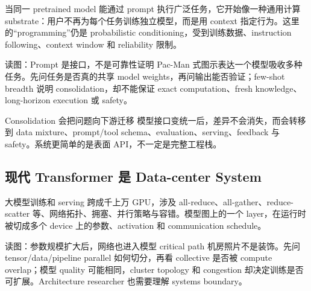 当同一 pretrained model 能通过 prompt 执行广泛任务，它开始像一种通用计算 substrate：用户不再为每个任务训练独立模型，而是用 context 指定行为。这里的“programming”仍是 probabilistic conditioning，受到训练数据、instruction following、context window 和 reliability 限制。


\begin{knowledgebox}{读图：Prompt 是接口，不是可靠性证明}
Pac-Man 式图示表达一个模型吸收多种任务。先问任务是否真的共享 model weights，再问输出能否验证；few-shot breadth 说明 consolidation，却不能保证 exact computation、fresh knowledge、long-horizon execution 或 safety。
\end{knowledgebox}

\begin{importantbox}{Consolidation 会把问题向下游迁移}
模型接口变统一后，差异不会消失，而会转移到 data mixture、prompt/tool schema、evaluation、serving、feedback 与 safety。系统更简单的是表面 API，不一定是完整工程栈。
\end{importantbox}

\subsection{现代 Transformer 是 Data-center System}

大模型训练和 serving 跨成千上万 GPU，涉及 all-reduce、all-gather、reduce-scatter 等、网络拓扑、拥塞、并行策略与容错。模型图上的一个 layer，在运行时被切成多个 device 上的参数、activation 和 communication schedule。


\begin{knowledgebox}{读图：参数规模扩大后，网络也进入模型 critical path}
机房照片不是装饰。先问 tensor/data/pipeline parallel 如何切分，再看 collective 是否被 compute overlap；模型 quality 可能相同，cluster topology 和 congestion 却决定训练是否可扩展。Architecture researcher 也需要理解 systems boundary。
\end{knowledgebox}


